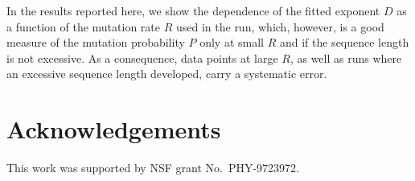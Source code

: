 \documentclass[letterpaper]{article}
\begin{document}
In the results reported here, we show the dependence of the fitted
exponent $D$ as a function of the mutation rate $R$ used in the run,
which, however, is a good measure of the mutation probability $P$ only
at small $R$ and if the sequence length is not excessive. As a
consequence, data points at large $R$, as well as runs where an
excessive sequence length developed, carry a systematic error.

\section{Acknowledgements}

This work was supported by NSF grant No.\ PHY-9723972.

\footnotesize

\end{document}
